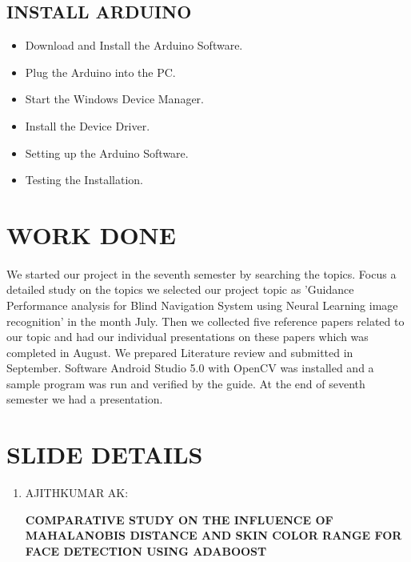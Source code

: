 \documentclass[10pt,a4paper,twoside]{report}
\begin{document}
\begin{appendix}
\begin{enumerate}
\end{enumerate}


\subsection{INSTALL ARDUINO}
\begin{itemize}
\item Download and Install the Arduino Software.
\item Plug the Arduino into the PC.
\item Start the Windows Device Manager.
\item Install the	 Device Driver.
\item Setting up the Arduino Software.
\item Testing the Installation.

\end{itemize}

\section{WORK DONE}
\paragraph{ }We started our project in the seventh semester by searching the topics. Focus a detailed study on the topics we selected our project topic as 'Guidance Performance analysis for Blind Navigation System using Neural Learning image recognition' in the month July. Then we collected five reference papers related to our topic and had our individual presentations on these papers which was completed in August. We prepared Literature review and submitted in September. Software Android Studio 5.0 with OpenCV
was installed and a sample program was run and verified by the guide. At the end of seventh semester we had a presentation.

\section{SLIDE DETAILS}
\begin{enumerate}


\item AJITHKUMAR AK:
\begin{center}
\textbf{COMPARATIVE STUDY ON THE INFLUENCE OF MAHALANOBIS DISTANCE AND SKIN COLOR RANGE FOR FACE DETECTION USING ADABOOST}
\end{center}
\begin{itemize}




\end{itemize}
\end{enumerate}
\end{appendix}
\end{document}
